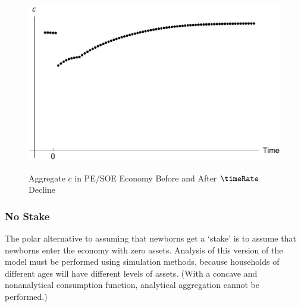 \documentclass{handout}
\begin{document}
\begin{figure}
\caption{Aggregate $c$ in PE/SOE Economy Before and After $\timeRate$ Decline}
\includegraphics[width=6in]{../Figures/SOEStakescPathAfterThetaDropPlot}
\label{fig:SOEStakescPathAfterThetaDropPlot}
\end{figure}

\subsubsection{No Stake}

The polar alternative to assuming that newborns get a `stake' is to
assume that newborns enter the economy with zero assets.  Analysis of
this version of the model must be performed using simulation methods,
because households of different ages will have different levels of
assets.  (With a concave and nonanalytical consumption function,
analytical aggregation cannot be performed.)
\end{document}
